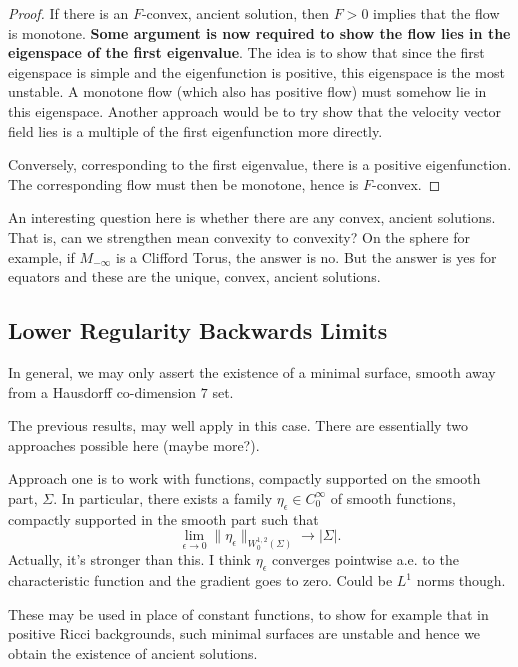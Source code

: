 \documentclass{amsart}
\begin{document}
\begin{proof}
If there is an \(F\)-convex, ancient solution, then \(F > 0\) implies that the flow is monotone. \textbf{Some argument is now required to show the flow lies in the eigenspace of the first eigenvalue}. The idea is to show that since the first eigenspace is simple and the eigenfunction is positive, this eigenspace is the most unstable. A monotone flow (which also has positive flow) must somehow lie in this eigenspace. Another approach would be to try show that the velocity vector field lies is a multiple of the first eigenfunction more directly.

Conversely, corresponding to the first eigenvalue, there is a positive eigenfunction. The corresponding flow must then be monotone, hence is \(F\)-convex.
\end{proof}

An interesting question here is whether there are any convex, ancient solutions. That is, can we strengthen mean convexity to convexity? On the sphere for example, if \(M_{-\infty}\) is a Clifford Torus, the answer is no. But the answer is yes for equators and these are the unique, convex, ancient solutions.

\subsection{Lower Regularity Backwards Limits}
\label{subsection:nonsmooth_backwards_limits}

In general, we may only assert the existence of a minimal surface, smooth away from a Hausdorff co-dimension \(7\) set.

The previous results, may well apply in this case. There are essentially two approaches possible here (maybe more?).

Approach one is to work with functions, compactly supported on the smooth part, \(\Sigma\). In particular, there exists a family \(\eta_{\epsilon} \in C^{\infty}_0\) of smooth functions, compactly supported in the smooth part such that
\[
\lim_{\epsilon \to 0} \|\eta_{\epsilon}\|_{W^{1,2}_0(\Sigma)} \to |\Sigma|.
\]
Actually, it's stronger than this. I think \(\eta_{\epsilon}\) converges pointwise a.e. to the characteristic function and the gradient goes to zero. Could be \(L^1\) norms though.

These may be used in place of constant functions, to show for example that in positive Ricci backgrounds, such minimal surfaces are unstable and hence we obtain the existence of ancient solutions.
\end{document}

